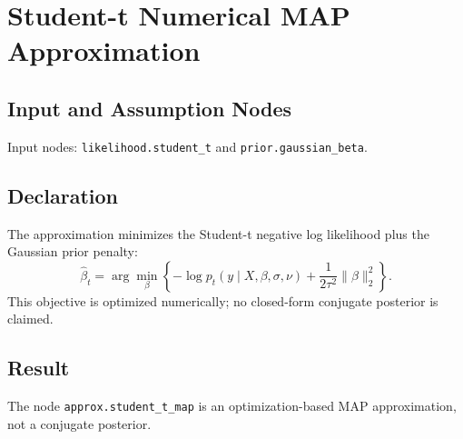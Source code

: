 \section{Student-t Numerical MAP Approximation}
\label{approx:student-t-map}

\subsection{Input and Assumption Nodes}
Input nodes: \texttt{likelihood.student\_t} and \texttt{prior.gaussian\_beta}.

\subsection{Declaration}
The approximation minimizes the Student-t negative log likelihood plus the Gaussian prior penalty:
\[
  \widehat{\beta}_{t}
  =
  \arg\min_{\beta}
  \left\{
  -\log p_t(y\mid X,\beta,\sigma,\nu)
  +
  \frac{1}{2\tau^2}\|\beta\|_2^2
  \right\}.
\]
This objective is optimized numerically; no closed-form conjugate posterior is claimed.

\subsection{Result}
The node \texttt{approx.student\_t\_map} is an optimization-based MAP approximation, not a conjugate posterior.
